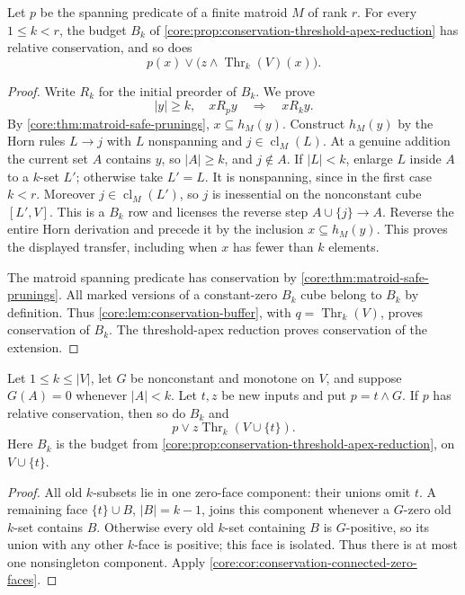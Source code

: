 \begin{theorem}
\label{core:thm:conservation-matroid-threshold}
Let $p$ be the spanning predicate of a finite matroid $M$ of rank $r$.
For every $1\leq k<r$, the budget $B_k$ of
\cref{core:prop:conservation-threshold-apex-reduction} has relative
conservation, and so does
\[
 p(x)\lor\bigl(z\land\operatorname{Thr}_k(V)(x)\bigr).
\]
\end{theorem}
\begin{proof}
Write $R_k$ for the initial preorder of $B_k$. We prove
\[
 |y|\geq k,\quad xR_py\quad\Longrightarrow\quad xR_ky.
\]
By \cref{core:thm:matroid-safe-prunings}, $x\subseteq h_M(y)$.
Construct $h_M(y)$ by the Horn rules $L\to j$ with $L$ nonspanning and
$j\in\operatorname{cl}_M(L)$. At a genuine addition the current set
$A$ contains $y$, so $|A|\geq k$, and $j\notin A$.
If $|L|<k$, enlarge $L$ inside $A$ to a $k$-set $L'$; otherwise take
$L'=L$. It is nonspanning, since in the first case $k<r$.
Moreover $j\in\operatorname{cl}_M(L')$, so $j$ is inessential on the
nonconstant cube $[L',V]$. This is a $B_k$ row and licenses the reverse
step $A\cup\{j\}\to A$.
Reverse the entire Horn derivation and precede it by the inclusion
$x\subseteq h_M(y)$. This proves the displayed transfer, including
when $x$ has fewer than $k$ elements.

The matroid spanning predicate has conservation by
\cref{core:thm:matroid-safe-prunings}. All marked versions of a
constant-zero $B_k$ cube belong to $B_k$ by definition. Thus
\cref{core:lem:conservation-buffer}, with
$q=\operatorname{Thr}_k(V)$, proves conservation of $B_k$.
The threshold-apex reduction proves conservation of the extension.
\end{proof}

\begin{theorem}
\label{core:thm:conservation-required-input}
Let $1\leq k\leq|V|$, let $G$ be nonconstant and monotone on $V$, and
suppose $G(A)=0$ whenever $|A|<k$. Let $t,z$ be new inputs and put
$p=t\land G$. If $p$ has relative conservation, then so do $B_k$ and
\[
 p\lor z\operatorname{Thr}_k(V\cup\{t\}).
\]
Here $B_k$ is the budget from
\cref{core:prop:conservation-threshold-apex-reduction}, on $V\cup\{t\}$.
\end{theorem}
\begin{proof}
All old $k$-subsets lie in one zero-face component: their unions omit $t$.
A remaining face $\{t\}\cup B$, $|B|=k-1$, joins this component whenever
a $G$-zero old $k$-set contains $B$. Otherwise every old $k$-set containing
$B$ is $G$-positive, so its union with any other $k$-face is positive;
this face is isolated. Thus there is at most one nonsingleton component.
Apply \cref{core:cor:conservation-connected-zero-faces}.
\end{proof}
